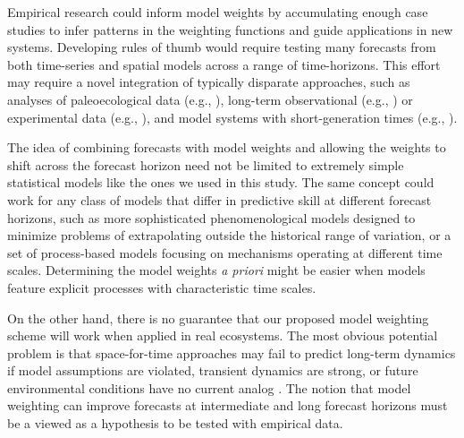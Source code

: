 \documentclass[11pt]{article}
\begin{document}
Empirical research could inform model weights by accumulating enough case studies to infer patterns in the weighting functions and guide applications in new systems. Developing  rules of thumb would require testing many forecasts from both time-series and spatial models across a range of time-horizons. This effort may require a novel integration of typically disparate approaches, such as analyses of paleoecological data (e.g., \citealt{Worth2014}), long-term observational (e.g., \citealt{Nice2019}) or experimental data (e.g., \citealt{Silvertown2006}), and model systems with short-generation times (e.g., \citealt{Good2017}). 

The idea of combining forecasts with model weights and allowing the weights to shift across the forecast horizon need not be limited to extremely simple statistical models like the ones we used in this study. The same concept could work for any class of models that differ in predictive skill at different forecast horizons, such as more sophisticated phenomenological models designed to minimize problems of extrapolating outside the historical range of variation, or a set of process-based models focusing on mechanisms operating at different time scales.  Determining the model weights \emph{a priori} might be easier when models feature explicit processes with characteristic time scales. 

On the other hand, there is no guarantee that our proposed model weighting scheme will work when applied in real ecosystems. The most obvious potential problem is that space-for-time approaches may fail to predict long-term dynamics if model assumptions are violated, transient dynamics are strong, or future environmental conditions have no current analog \citep{Worth2014,Veloz2012}. The notion that model weighting can improve forecasts at intermediate and long forecast horizons must be a viewed as a hypothesis to be tested with empirical data.
\end{document}
